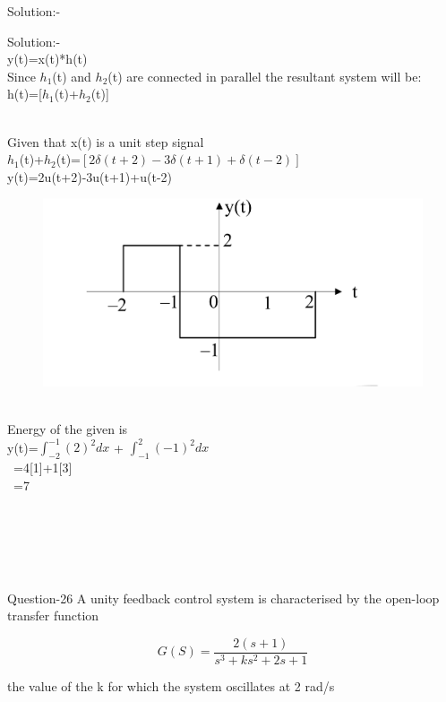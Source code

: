 \documentclass[journal,12pt,twocolumn]{IEEEtran}
\begin{document}
\begin{frame}{Solution:- }
\begin{frame}{Solution:- }
\\y(t)=x(t)*h(t)
\\Since $h_1$(t) and $h_2$(t) are connected in parallel the resultant system will be:
\\ h(t)=[$h_1$(t)+$h_2$(t)]
\end{frame}
\begin{frame}{}
\\ Given that x(t) is a unit step signal
\\$h_1$(t)+$h_2$(t)=$[2\delta(t+2)-3\delta(t+1)+\delta(t-2)]$
\\y(t)=2u(t+2)-3u(t+1)+u(t-2)
\begin{figure}[h]
    \includegraphics[scale=0.15]{./figs/16.png}
\end{figure}
\\Energy of the given is
\\y(t)=$\int_{-2}^{-1} (2)^2 dx$ + $\int_{-1}^{2} (-1)^2 dx$
\\\quad\  =4[1]+1[3]
\\\quad\ =7  
\\\\\\
\end{frame}
\\\\
\begin{frame}{Question-26 }
A unity feedback control system is characterised by the open-loop transfer function\\
\begin{centre}
$$
 G(S) = \frac{2(s+1)}{s^3 + ks^2 + 2s +1}
$$
\end{centre}

the value of the k for which the system oscillates at 2 rad/s \\

\end{frame}
\begin{frame}{}
\begin{centre}



\end{centre}
\end{frame}
\end{frame}
\end{document}
